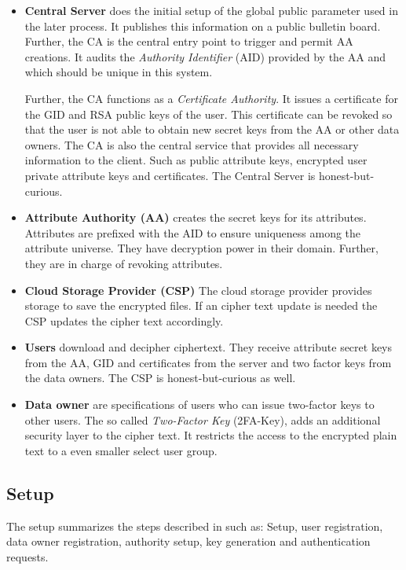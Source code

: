 \begin{itemize}
  \item \textbf{Central Server} does the initial setup of the global public parameter used in the later process. It publishes this information on a public bulletin board. Further, the CA is the central entry point to trigger and permit AA creations. It audits the \textit{Authority Identifier} (\ac{AID}) provided by the AA and which should be unique in this system. 

Further, the CA functions as a \textit{Certificate Authority}. It issues a certificate for the GID and RSA public keys of the user. This certificate can be revoked so that the user is not able to obtain new secret keys from the AA or other data owners.
The CA is also the central service that provides all necessary information to the client. Such as public attribute keys, encrypted user private attribute keys and certificates.
 The Central Server is honest-but-curious.
  \item \textbf{Attribute Authority (\ac{AA})} creates the secret keys for its attributes. Attributes are prefixed with the \ac{AID} to ensure uniqueness among the attribute universe. They have decryption power in their domain. Further, they are in charge of revoking attributes. 
  \item \textbf{Cloud Storage Provider (\ac{CSP})} The cloud storage provider provides storage to save the encrypted files. If an cipher text update is needed the CSP updates the cipher text accordingly. 
  \item \textbf{Users} download and decipher ciphertext. They receive attribute secret keys from the AA, GID and certificates from the server and two factor keys from the data owners. The CSP is honest-but-curious as well.
  \item \textbf{Data owner} are specifications of users who can issue two-factor keys to other users. The so called \textit{Two-Factor Key} (\ac{2FA}-Key), adds an additional security layer to the cipher text. It restricts the access to the encrypted plain text to a even smaller select user group.  
\end{itemize}

\subsection{Setup}
The setup summarizes the steps described in \cite{li2017two} such as: Setup, user registration, data owner registration, authority setup, key generation and authentication requests. 

